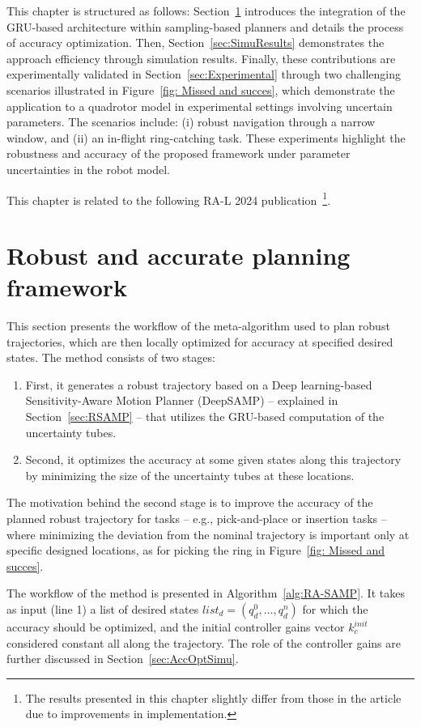 This chapter is structured as follows: Section~\ref{sec:RASAMP} introduces the integration of the GRU-based architecture within sampling-based planners and details the process of accuracy optimization.
Then, Section~\ref{sec:SimuResults} demonstrates the approach efficiency through simulation results.
Finally, these contributions are experimentally validated in Section~\ref{sec:Experimental} through two challenging scenarios illustrated in Figure~\ref{fig: Missed and succes}, which demonstrate the application to a quadrotor model in experimental settings involving uncertain parameters. 
The scenarios include: (i) robust navigation through a narrow window, and (ii) an in-flight ring-catching task. 
These experiments highlight the robustness and accuracy of the proposed framework under parameter uncertainties in the robot model.

This chapter is related to the following RA-L 2024 publication~\cite{cRAL}\footnote{The results presented in this chapter slightly differ from those in the article due to improvements in implementation.}.

\section{Robust and accurate planning framework}\label{sec:RASAMP}

This section presents the workflow of the meta-algorithm used to plan robust trajectories, which are then locally optimized for accuracy at specified desired states. 
The method consists of two stages: 
\begin{enumerate}
    \item First, it generates a robust trajectory based on a Deep learning-based Sensitivity-Aware Motion Planner (DeepSAMP) -- explained in Section~\ref{sec:RSAMP} -- that utilizes the GRU-based computation of the uncertainty tubes.
    \item Second, it optimizes the accuracy at some given states along this trajectory by minimizing the size of the uncertainty tubes at these locations.
\end{enumerate}

The motivation behind the second stage is to improve the accuracy of the planned robust trajectory for tasks -- e.g., pick-and-place or insertion tasks -- where minimizing the deviation from the nominal trajectory is important only at specific designed locations, as for picking the ring in Figure~\ref{fig: Missed and succes}.

The workflow of the method is presented in Algorithm~\ref{alg:RA-SAMP}. 
It takes as input (line 1) a list of desired states $list_{d} = (q_{d}^0, \dots, q_{d}^n)$ for which the accuracy should be optimized, and the initial controller gains vector $k_{c}^{init}$ considered constant all along the trajectory.
The role of the controller gains are further discussed in Section~\ref{sec:AccOptSimu}.

